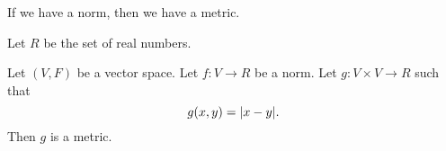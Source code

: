 
\sbasic





















\sstart
{}


If we have a norm, then we
have a metric.


Let $R$ be the set of real
numbers.

\begin{prop}
Let $(V, F)$ be a vector space.
Let $f: V \to R$ be a norm.
Let $g: V \times V \to R$ such
that
\[
  g(x, y) = \lvert x - y\rvert.
\]
Then $g$ is a metric.
\end{prop}
\strats
